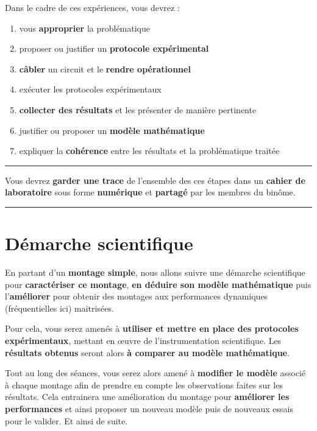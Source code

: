\documentclass[a4paper,11pt,twoside]{book} %
\begin{document}
{\medskip

Dans le cadre de ces expériences, vous devrez :

\begin{enumerate}
	\item vous \textbf{approprier} la problématique
	\item proposer ou justifier un \textbf{protocole expérimental}
	\item \textbf{câbler} un circuit et le \textbf{rendre opérationnel}
	\item exécuter les protocoles expérimentaux
	\item \textbf{collecter des résultats} et les présenter de manière pertinente
	\item justifier ou proposer un \textbf{modèle mathématique}
	\item expliquer la \textbf{cohérence} entre les résultats et la problématique traitée

\end{enumerate}

\bigskip


\noindent \rule{\linewidth}{1pt}

{\large
Vous devrez \textbf{garder une trace} de l'ensemble des ces étapes dans un \textbf{cahier de laboratoire} sous forme \textbf{numérique} et \textbf{partagé} par les membres du binôme.
}

\noindent \rule{\linewidth}{1pt}

\section{Démarche scientifique}

En partant d'un \textbf{montage simple}, nous allons suivre une démarche scientifique pour \textbf{caractériser ce montage}, \textbf{en déduire son modèle mathématique} puis l'\textbf{améliorer} pour obtenir des montages aux performances dynamiques (fréquentielles ici) maitrisées.

\medskip

Pour cela, vous serez amenés à \textbf{utiliser et mettre en place des protocoles expérimentaux}, mettant en \oe{}uvre de l'instrumentation scientifique. Les \textbf{résultats obtenus} seront alors \textbf{à comparer au modèle mathématique}.

\medskip

Tout au long des séances, vous serez alors amené à \textbf{modifier le modèle} associé à chaque montage afin de prendre en compte les observations faites sur les résultats. Cela entrainera une amélioration du montage pour \textbf{améliorer les performances} et ainsi proposer un nouveau modèle puis de nouveaux essais pour le valider. Et ainsi de suite.


}
\end{document}

